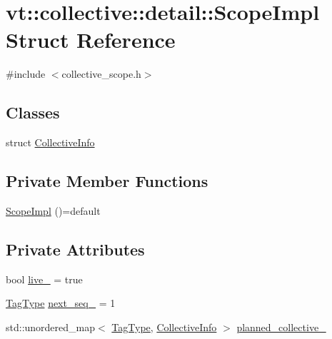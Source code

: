 \hypertarget{structvt_1_1collective_1_1detail_1_1_scope_impl}{}\section{vt\+:\+:collective\+:\+:detail\+:\+:Scope\+Impl Struct Reference}
\label{structvt_1_1collective_1_1detail_1_1_scope_impl}


{\ttfamily \#include $<$collective\+\_\+scope.\+h$>$}

\subsection*{Classes}
\begin{DoxyCompactItemize}
\item 
struct \hyperlink{structvt_1_1collective_1_1detail_1_1_scope_impl_1_1_collective_info}{Collective\+Info}
\end{DoxyCompactItemize}
\subsection*{Private Member Functions}
\begin{DoxyCompactItemize}
\item 
\hyperlink{structvt_1_1collective_1_1detail_1_1_scope_impl_a47576d9402b53721b08154f8fafb2646}{Scope\+Impl} ()=default
\end{DoxyCompactItemize}
\subsection*{Private Attributes}
\begin{DoxyCompactItemize}
\item 
bool \hyperlink{structvt_1_1collective_1_1detail_1_1_scope_impl_a37df162b45d5f4f8222083efdc99183d}{live\+\_\+} = true
\item 
\hyperlink{namespacevt_a84ab281dae04a52a4b243d6bf62d0e52}{Tag\+Type} \hyperlink{structvt_1_1collective_1_1detail_1_1_scope_impl_a66d11b610384061b202fff45d2f18bbf}{next\+\_\+seq\+\_\+} = 1
\item 
std\+::unordered\+\_\+map$<$ \hyperlink{namespacevt_a84ab281dae04a52a4b243d6bf62d0e52}{Tag\+Type}, \hyperlink{structvt_1_1collective_1_1detail_1_1_scope_impl_1_1_collective_info}{Collective\+Info} $>$ \hyperlink{structvt_1_1collective_1_1detail_1_1_scope_impl_a6eaa0beff1bd71895daec9f7ca6152c8}{planned\+\_\+collective\+\_\+}
\end{DoxyCompactItemize}


